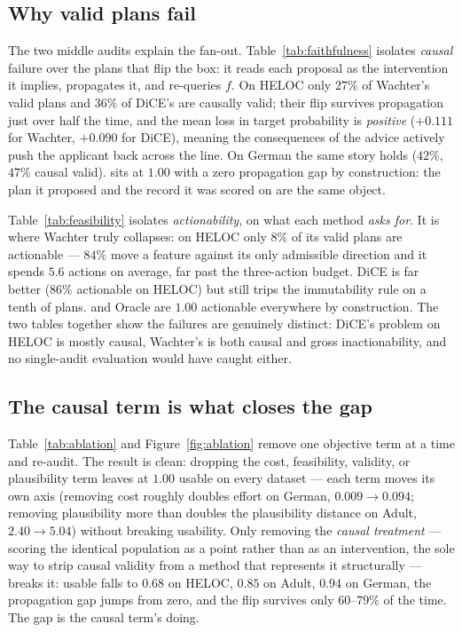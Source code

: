 


\subsection{Why valid plans fail}
\label{sec:exp:why}
The two middle audits explain the fan-out.
Table~\ref{tab:faithfulness} isolates \emph{causal} failure over the plans that
flip the box: it reads each proposal as the intervention it implies, propagates it,
and re-queries $f$. On HELOC only $27\%$ of Wachter's valid plans and $36\%$ of
DiCE's are causally valid; their flip survives propagation just over half the
time, and the mean loss in target probability is \emph{positive} ($+0.111$ for
Wachter, $+0.090$ for DiCE), meaning the consequences of the advice actively push
the applicant back across the line. On German the same story holds ($42\%$, $47\%$
causal valid). \cac{} sits at $1.00$ with a zero propagation gap by construction:
the plan it proposed and the record it was scored on are the same object.

Table~\ref{tab:feasibility} isolates \emph{actionability}, on what each method
\emph{asks for}. It is where Wachter truly collapses: on HELOC only $8\%$ of its
valid plans are actionable --- $84\%$ move a feature against its only admissible
direction and it spends $5.6$ actions on average, far past the three-action
budget. DiCE is far better ($86\%$ actionable on HELOC) but still trips the
immutability rule on a tenth of plans. \cac{} and Oracle are $1.00$ actionable
everywhere by construction. The two tables together show the failures are
genuinely distinct: DiCE's problem on HELOC is mostly causal, Wachter's is both
causal and gross inactionability, and no single-audit evaluation would have caught
either.




\subsection{The causal term is what closes the gap}
\label{sec:exp:ablation}
Table~\ref{tab:ablation} and Figure~\ref{fig:ablation} remove one objective term
at a time and re-audit. The result is clean: dropping the cost, feasibility,
validity, or plausibility term leaves \cac{} at $1.00$ usable on every dataset ---
each term moves its own axis (removing cost roughly doubles effort on German,
$0.009\!\to\!0.094$; removing plausibility more than doubles the plausibility
distance on Adult, $2.40\!\to\!5.04$) without breaking usability. Only removing the
\emph{causal treatment} --- scoring the identical population as a point rather than
as an intervention, the sole way to strip causal validity from a method that
represents it structurally --- breaks it: usable falls to $0.68$ on HELOC, $0.85$
on Adult, $0.94$ on German, the propagation gap jumps from zero, and the flip
survives only $60$--$79\%$ of the time. The gap is the causal term's doing.

